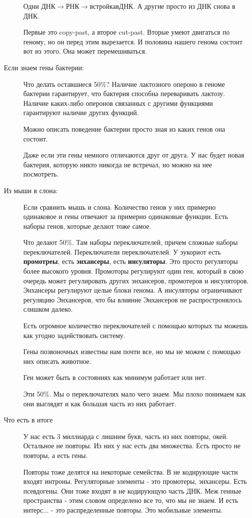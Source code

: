 \begin{description}
Одни $ДНК \to РНК \to встройка в ДНК$. 
А другие просто из ДНК снова в ДНК. 

Первые это copy-past, а второе cut-past. 
Вторые умеют двигаться по геному, но он перед этим вырезается. И половина
нашего генома состоит вот из этого. Она может перемешиваться. 

\item[Если знаем гены бактерии:]
Что делать оставшиеся 50\%? Наличие лактозного опероно в геноме
бактерии гарантирует, что бактерия способна переваривать 
лактозу. Наличие каких-либо оперонов 
связанных с другими функциями гарантируют 
наличие других функций. 

Можно описать поведение бактерии просто 
зная из каких генов она состоит. 

Даже если эти гены немного отличаются друг от друга. 
У нас будет новая бактерия, которую никто никогда не встречал, 
но можно на нее посмотреть.

\item[Из мыши в слона:]
Если сравнить мышь и слона. Количество генов у них примерно одинаковое и 
гены отвечают за примерно одинаковые функции. Есть наборы генов, 
которые делают тоже самое. 

Что делают 50\%. Там наборы переключателей, причем 
сложные наборы переключателей. Переключатели переключателей. 
У эукориот есть \textbf{промотреы}, есть \textbf{энхансеры}, есть \textbf{инсуляторы}. 
Это просто регуляторы более высокого уровня. Промоторы регулируют один ген, 
который в свою очередь может регулировать других энхансеров, промотеров и 
инсуляторов. Энхансеры регулируют целые блоки генома. А инсуляторы ограничивают регуляцию 
Энхансеров, что бы влияние Энхансеров не распростронялось слишком далеко.

Есть огромное количество переключателей с помощью которых ты можешь как угодно
задействовать систему.

Гены позвоночных известны нам почти все, но мы не можем
с помощью них описать животное.

Ген может быть в состояниях как минимум работает или нет.

Эти 50\%. Мы о переключателях мало чего знаем. Мы
плохо понимаем как они выглядят и как большая часть из них
работает.
\item[Что есть в итоге]
У нас есть 3 миллиарда с лишним букв, часть из них
повторы, окей. Остальное не повторы. Из них у нас
есть два множества. Есть просто не повторы, а есть гены.

Повторы тоже делятся на некоторые семейства. В не кодирующие
части входят интроны. Регуляторные элементы - это
промотеры, энхансеры. Есть псевдогены. Они тоже
входят в не кодирующую часть ДНК. Меж генные пространства -
этим словом определено все то, что мы не знаем. И есть
\TODO интерс... - это распределенные повторы. Это мобильные элементы.
\end{description}


